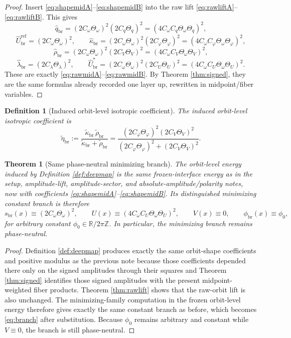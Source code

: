 \documentclass[11pt]{article}
\newcommand{\RespShapeCov}{\widetilde\kappa_{\mathrm{br}}}
\newcommand{\RespShapeRelax}{\widetilde\rho_{\mathrm{br}}}
\newcommand{\RespShapeIso}{\widetilde\eta_{\mathrm{br}}}
\newcommand{\RespRawReadout}{\widehat q_{\mathrm{br}}}
\newcommand{\RespRawRef}{\widehat U_{\mathrm{br}}^{\mathrm{ref}}}
\newcommand{\RespRawCov}{\widehat\kappa_{\mathrm{br}}}
\newcommand{\RespRawRelax}{\widehat\rho_{\mathrm{br}}}
\newcommand{\RespRawWell}{\widehat\lambda_{\mathrm{br}}}
\newcommand{\RespRawEq}{\widehat U_{\mathrm{br}}^{\ast}}
\newcommand{\RespVacPhase}{\phi_{\mathrm{br}}}
\newcommand{\ScaleMod}{s_{\mathrm{br}}}
\newcommand{\MidRead}{C_{q}}
\newcommand{\MidCov}{C_{\varphi}}
\newcommand{\MidRelax}{C_{V}}
\newcommand{\MidWell}{C_{\lambda}}
\newcommand{\MidEq}{C_{U}}
\newcommand{\MidScale}{C_{\omega}}
\newcommand{\FiberRead}{\Theta_{q}}
\newcommand{\FiberCov}{\Theta_{\varphi}}
\newcommand{\FiberRelax}{\Theta_{V}}
\newcommand{\FiberWell}{\Theta_{\lambda}}
\newcommand{\FiberEq}{\Theta_{U}}
\newcommand{\FiberScale}{\Theta_{\omega}}
\newtheorem{definition}{Definition}
\newtheorem{theorem}{Theorem}
\begin{document}
\begin{proof}
Insert \eqref{eq:shapemidA}--\eqref{eq:shapemidB} into the raw lift \eqref{eq:rawliftA}--\eqref{eq:rawliftB}. This gives
\[
\RespRawReadout=(2\MidScale\FiberScale)^{2}(2\MidRead\FiberRead)^{2}
=(4\MidScale\MidRead\FiberScale\FiberRead)^{2},
\]
\[
\RespRawRef=(2\MidScale\FiberScale)^{2},
\qquad
\RespRawCov=(2\MidScale\FiberScale)^{2}(2\MidCov\FiberCov)^{2}
=(4\MidScale\MidCov\FiberScale\FiberCov)^{2},
\]
\[
\RespRawRelax=(2\MidScale\FiberScale)^{2}(2\MidRelax\FiberRelax)^{2}
=(4\MidScale\MidRelax\FiberScale\FiberRelax)^{2},
\]
\[
\RespRawWell=(2\MidWell\FiberWell)^{2},
\qquad
\RespRawEq=(2\MidScale\FiberScale)^{2}(2\MidEq\FiberEq)^{2}
=(4\MidScale\MidEq\FiberScale\FiberEq)^{2}.
\]
These are exactly \eqref{eq:rawmidA}--\eqref{eq:rawmidB}. By Theorem \ref{thm:signed}, they are the same formulas already recorded one layer up, rewritten in midpoint/fiber variables.
\end{proof}

\begin{definition}[Induced orbit-level isotropic coefficient]
\label{def:isocoeff}
The induced orbit-level isotropic coefficient is
\begin{equation}
\RespShapeIso
:=
\frac{\RespShapeCov\,\RespShapeRelax}{\RespShapeCov+\RespShapeRelax}
=
\frac{(2\MidCov\FiberCov)^{2}(2\MidRelax\FiberRelax)^{2}}{(2\MidCov\FiberCov)^{2}+(2\MidRelax\FiberRelax)^{2}}.
\label{eq:iso}
\end{equation}
\end{definition}

\begin{theorem}[Same phase-neutral minimizing branch]
\label{thm:branch}
The orbit-level energy induced by Definition \ref{def:deepmap} is the same frozen-interface energy as in the setup, amplitude-lift, amplitude-sector, and absolute-amplitude/polarity notes, now with coefficients \eqref{eq:shapemidA}--\eqref{eq:shapemidB}. Its distinguished minimizing constant branch is therefore
\begin{equation}
\ScaleMod(x)\equiv(2\MidScale\FiberScale)^{2},
\qquad
U(x)\equiv(4\MidScale\MidEq\FiberScale\FiberEq)^{2},
\qquad
V(x)\equiv0,
\qquad
\RespVacPhase(x)\equiv\phi_{0},
\label{eq:branch}
\end{equation}
for arbitrary constant \(\phi_{0}\in\mathbb R/2\pi\mathbb Z\). In particular, the minimizing branch remains phase-neutral.
\end{theorem}

\begin{proof}
Definition \ref{def:deepmap} produces exactly the same orbit-shape coefficients and positive modulus as the previous note because those coefficients depended there only on the signed amplitudes through their squares and Theorem \ref{thm:signed} identifies those signed amplitudes with the present midpoint-weighted fiber products. Theorem \ref{thm:rawlift} shows that the raw-orbit lift is also unchanged. The minimizing-family computation in the frozen orbit-level energy therefore gives exactly the same constant branch as before, which becomes \eqref{eq:branch} after substitution. Because \(\phi_{0}\) remains arbitrary and constant while \(V\equiv0\), the branch is still phase-neutral.
\end{proof}
\end{document}

